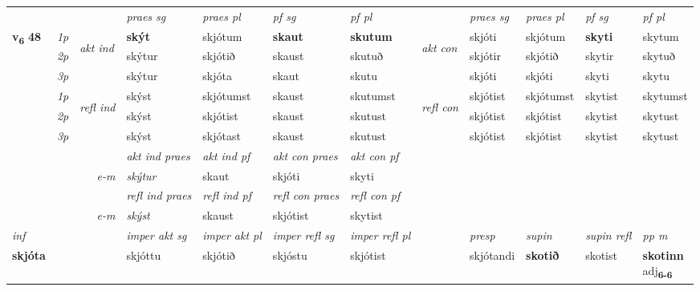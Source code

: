 \begin{longtable}[l]{X>{\footnotesize\itshape}llXXXXlXXXX}
\midrule

 & &   & \textit{praes sg}  & \textit{praes pl}    & \textit{ pf sg} & \textit{pf pl} & & \textit{praes sg}  & \textit{praes pl}    & \textit{pf sg} & \textit{pf pl }  \\ \cmidrule{4-7} \cmidrule{9-12}
 \multirow{2}{*}{{{\textbf{v{\textsubscript{6}}} \Large{\textbf{48}}}}}  & 1p & \multirow{3}{*}{\begin{turn}{90}\textit{akt ind}\end{turn}} & \textbf{skýt} & skjótum & \textbf{skaut} & \textbf{skutum} & \multirow{3}{*}{\begin{turn}{90}\textit{akt con}\end{turn}} &skjóti & skjótum & \textbf{skyti} & skytum\\*
 & 2p &  &  skýtur  & skjótið & skaust & skutuð & & skjótir & skjótið & skytir & skytuð \\*
 & 3p &  & skýtur & skjóta & skaut & skutu & & skjóti & skjóti& skyti & skytu \\*
\cmidrule{4-7} \cmidrule{9-12}
 & 1p & \multirow{3}{*}{\begin{turn}{90}\textit{refl ind}\end{turn}}  & skýst & skjótumst & skaust & skutumst & \multirow{3}{*}{\begin{turn}{90}\textit{refl con}\end{turn}}  &skjótist & skjótumst & skytist & skytumst \\*
 & 2p &  & skýst & skjótist & skaust & skutust & &skjótist & skjótist & skytist & skytust \\*
 & 3p  & & skýst & skjótast & skaust & skutust & & skjótist & skjótist& skytist & skytust \\*
\cmidrule{4-7} \cmidrule{9-12}

   && &  \textit{akt ind praes} & \textit{akt ind pf} & \textit{akt con praes} & \textit{akt con pf} \\*
\multicolumn{3}{r}{\textit{e-m}} & skýtur & skaut & skjóti & skyti \\*

\cmidrule{4-7}
 & && \textit{refl ind praes} & \textit{refl ind pf} & \textit{refl con praes} & \textit{refl con pf} \\*
\multicolumn{3}{r}{\textit{e-m}}& skýst & skaust & skjótist & skytist \\*

\cmidrule{4-7}
   {\textit{inf}} & &  & \textit{imper akt sg} & \textit{imper akt pl} & \textit{imper refl sg} & \textit{imper refl pl} && \textit{presp} & \textit{supin} & \textit{supin refl} & \textit{pp m} \\*
  {\textbf{skjóta}} & && skjóttu  & skjótið & skjóstu & skjótist && skjótandi &  \textbf{skotið} & skotist & \specialcell{\textbf{skotinn} \\ adj\textbf{\textsubscript{6-6}}} \\*


\end{longtable}
